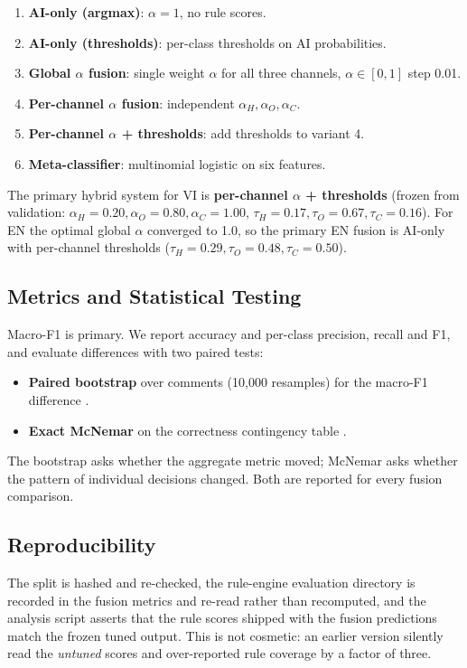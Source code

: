 \begin{enumerate}
    \item \textbf{AI-only (argmax)}: $\alpha=1$, no rule scores.
    \item \textbf{AI-only (thresholds)}: per-class thresholds on AI probabilities.
    \item \textbf{Global $\alpha$ fusion}: single weight $\alpha$ for all three
          channels, $\alpha \in [0,1]$ step 0.01.
    \item \textbf{Per-channel $\alpha$ fusion}: independent $\alpha_H, \alpha_O,
          \alpha_C$.
    \item \textbf{Per-channel $\alpha$ + thresholds}: add thresholds to variant 4.
    \item \textbf{Meta-classifier}: multinomial logistic on six features.
\end{enumerate}

The primary hybrid system for VI is \textbf{per-channel $\alpha$ + thresholds}
(frozen from validation: $\alpha_H=0.20,\alpha_O=0.80,\alpha_C=1.00$,
$\tau_H=0.17,\tau_O=0.67,\tau_C=0.16$).  For EN the optimal global $\alpha$ converged to
1.0, so the primary EN fusion is AI-only with per-channel thresholds
($\tau_H=0.29,\tau_O=0.48,\tau_C=0.50$).

\subsection{Metrics and Statistical Testing}
\label{sec:metrics}
Macro-F1 is primary.  We report accuracy and per-class
precision, recall and F1, and evaluate differences with two paired tests:
\begin{itemize}
    \item \textbf{Paired bootstrap} over comments (10,000 resamples) for the
          macro-F1 difference \cite{efron1993bootstrap}.
    \item \textbf{Exact McNemar} on the correctness contingency table
          \cite{mcnemar1947note}.
\end{itemize}
The bootstrap asks whether the aggregate metric moved; McNemar asks whether
the pattern of individual decisions changed.  Both are reported for every
fusion comparison.

\subsection{Reproducibility}
\label{sec:repro}
The split is hashed and re-checked, the rule-engine evaluation directory is
recorded in the fusion metrics and re-read rather than recomputed, and the
analysis script asserts that the rule scores shipped with the fusion
predictions match the frozen tuned output.  This is not cosmetic: an earlier
version silently read the \emph{untuned} scores and over-reported rule
coverage by a factor of three.

